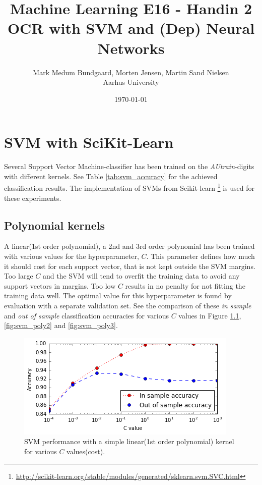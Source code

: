 \documentclass[a4paper,10pt,article,oneside,english]{memoir}
\begin{document}
	\title{Machine Learning E16 - Handin 2\\OCR with SVM and (Dep) Neural Networks}
	\author{Mark Medum Bundgaard, Morten Jensen, Martin Sand Nielsen\\ Aarhus University}
	\date{\today}
	
	\mainmatter
	\maketitle
	
	
	
	
	
	
	
\chapter{SVM with SciKit-Learn}
Several Support Vector Machine-classifier has been trained on the \emph{AUtrain}-digits with different kernels. See Table \ref{tab:svm_accuracy} for the achieved classification results. The implementation of SVMs from Scikit-learn  \footnote{ \url{http://scikit-learn.org/stable/modules/generated/sklearn.svm.SVC.html}}
is used for these experiments.

\section{Polynomial kernels}
A linear(1st order polynomial), a 2nd and 3rd order polynomial has been trained with various values for the hyperparameter, $C$. This parameter defines how much it should cost for each support vector, that is not kept outside the SVM margins. Too large $C$ and the SVM will tend to overfit the training data to avoid any support vectors in margins. Too low $C$ results in no penalty for not fitting the training data well. The optimal value for this hyperparameter is found by evaluation with a separate validation set. See the comparison of these \emph{in sample} and \emph{out of sample} classification accuracies for various $C$ values in Figure \ref{fig:svm_lin}, \ref{fig:svm_poly2} and \ref{fig:svm_poly3}.


\begin{figure}[h!]
	\centering
	\includegraphics[width=0.7\linewidth]{svm_lin.PNG}
	\caption{SVM performance with a simple linear(1st order polynomial) kernel for various $C$  values(cost).}
	\label{fig:svm_lin}
\end{figure}
\end{document}
